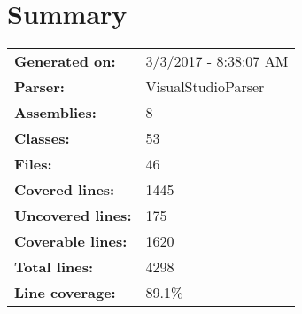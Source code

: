 \documentclass[a4paper,10pt]{article}
\begin{document}
\setcounter{secnumdepth}{-1}
\section{Summary}
\begin{longtable}[l]{ll}
\textbf{Generated on:} & 3/3/2017 - 8:38:07 AM\\
\textbf{Parser:} & VisualStudioParser\\
\textbf{Assemblies:} & 8\\
\textbf{Classes:} & 53\\
\textbf{Files:} & 46\\
\textbf{Covered lines:} & 1445\\
\textbf{Uncovered lines:} & 175\\
\textbf{Coverable lines:} & 1620\\
\textbf{Total lines:} & 4298\\
\textbf{Line coverage:} & 89.1\%\\
\end{longtable}
\end{document}
